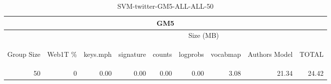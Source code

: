 \begin{center}
\begin{table}[htbp] 
 \begin{center}
\begin{tabular}{ | r | r | r | r | r | r | r | r | r |}
\hline
\multicolumn{9}{|c|}{GM5}\\
\hline
 & & \multicolumn{7}{|c|}{Size (MB)}\\ \cline{3-9}
\begin{sideways}Group Size\end{sideways} & \begin{sideways}Web1T \% \end{sideways} & \begin{sideways}keys.mph\end{sideways} & \begin{sideways}signature\end{sideways} & \begin{sideways}counts\end{sideways} & \begin{sideways}logprobs\end{sideways} & \begin{sideways}vocabmap\end{sideways} & \begin{sideways}Authors Model \end{sideways} & \begin{sideways}TOTAL\end{sideways}\\
\hline
\multirow{0}{*}{50}
 & 0 & 0.00 & 0.00 & 0.00 & 0.00 & 3.08 & 21.34 & 24.42\\ \cline{2-9}
\hline
\end{tabular}
\caption{SVM-twitter-GM5-ALL-ALL-50}
\label{table:SVM-twitter-GM5-ALL-ALL-50}
\end{center}
 \end{table}
\end{center}

